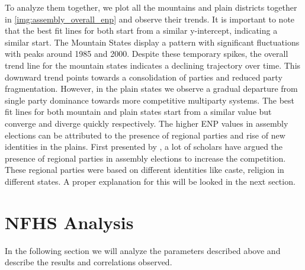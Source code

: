 To analyze them together, we plot all the mountains and plain districts together in \ref{img:assembly_overall_enp} and observe their trends. It is important to note that the best fit lines for both start from a similar y-intercept, indicating a similar start. The Mountain States display a pattern with significant fluctuations with peaks around 1985 and 2000. Despite these temporary spikes, the overall trend line for the mountain states indicates a declining trajectory over time. This downward trend points towards a consolidation of parties and reduced party fragmentation. However, in the plain states we observe a gradual departure from single party dominance towards more competitive multiparty systems. The best fit lines for both mountain and plain states start from a similar value but converge and diverge quickly respectively. The higher ENP values in assembly elections can be attributed to the presence of regional parties and rise of new identities in the plains. First presented by \citep{lijphart1994}, a lot of scholars have argued the presence of regional parties in assembly elections to increase the competition. These regional parties were based on different identities like caste, religion in different states. A proper explanation for this will be looked in the next section.




\section{NFHS Analysis}
In the following section we will analyze the parameters described above and describe the results and correlations observed.
